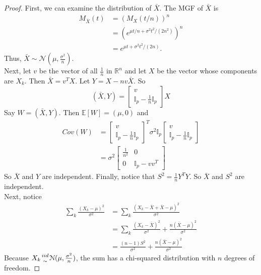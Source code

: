 \documentclass{article}
\theoremstyle{definition}\newtheorem{definition}{DEF}
\theoremstyle{definition}\newtheorem{example}{Ex}
\theoremstyle{lemma}\newtheorem{lemma}{Lemma}
\theoremstyle{corrolary}\newtheorem{corrolary}{Cor}
\begin{document}
\begin{proof}
First, we can examine the distribution of $\bar{X}$.
The MGF of $\bar{X}$ is
\begin{align*}
M_{\bar X}(t)
&=( M_X(t/n))^n \\
&= \left(e^{\mu t/n + \sigma^2 t^2/(2n^2)}\right)^n \\
&= e^{\mu t + \sigma^2 t^2/(2n)}.
\end{align*}
Thus, $\bar{X}\sim \mathcal{N}(\mu, \frac{\sigma^2}{n})$.\\
Next, let $v$ be the vector of all $\frac{1}{n}$ in $\mathbb{R}^n$ and let $X$ be the vector whose components are $X_k$.
Then $\bar{X}=v^T X$.
Let $Y=X-nv\bar{X}$.
So
\begin{equation*}
(\bar{X},Y)=
\left[
\begin{matrix}
v\\
\mathbb{I}_p-\frac{1}{n}\mathbb{I}_p
\end{matrix}
\right]
X
\end{equation*}
Say $W=(\bar{X},Y)$.
Then $\mathbb{E}[W]=(\mu, 0)$ and
\begin{align*}
Cov(W)&=\left[
\begin{matrix}
v\\
\mathbb{I}_p-\frac{1}{n}\mathbb{I}_p
\end{matrix}
\right]^T \sigma^2 \mathbb{I}_p \left[
\begin{matrix}
v\\
\mathbb{I}_p-\frac{1}{n}\mathbb{I}_p
\end{matrix}
\right]\\
&=\sigma^2 \left[
\begin{matrix}
\frac{1}{n^2} & 0 \\
0 & \mathbb{I}_p - vv^T
\end{matrix}
\right]
\end{align*}
So $\bar{X}$ and $Y$ are independent.
Finally, notice that $S^2=\frac{1}{n}Y^T Y$.
So $\bar{X}$ and $S^2$ are independent.\\
Next, notice
\begin{align*}
\sum_k \frac{(X_k-\mu)^2}{\sigma^2} &=\sum_k \frac{(X_k -\bar{X} + \bar{X} - \mu)^2}{\sigma^2}\\
&=\sum_k \frac{(X_k -\bar{X})^2}{\sigma^2} +\frac{n(\bar{X}-\mu)^2}{\sigma^2}\\
&=\frac{(n-1)S^2}{\sigma^2} + \frac{n(\bar{X}-\mu)^2}{\sigma^2}
\end{align*}
Because $X_k {iid \atop \sim} \mathcal{N}(\mu, \frac{\sigma^2}{n})$, the sum has a chi-squared distribution with $n$ degrees of freedom.

\end{proof}
\end{document}
